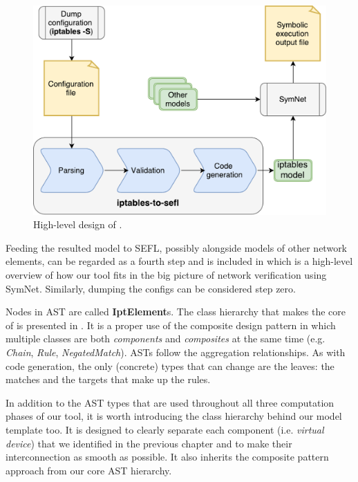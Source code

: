 \begin{figure}[h]
  \centering
  \captionsetup{justification=centering}
  \includegraphics[scale=0.5]{src/img/high-level-design}
  \caption{High-level design of \TOOL.}
  \label{fig:high-level-design}
\end{figure}

Feeding the resulted model to SEFL, possibly alongside models of other network
elements, can be regarded as a fourth step and is included in
 which is a high-level overview of
how our tool fits in the big picture of network verification using SymNet.
Similarly, dumping the configs can be considered step zero.

Nodes in AST are called \textbf{IptElement}s.  The class hierarchy that makes
the core of \TOOL is presented in .
It is a proper use of the composite design pattern in which multiple classes
are both \emph{components} and \emph{composites} at the same time (e.g.
\emph{Chain}, \emph{Rule}, \emph{NegatedMatch}).  ASTs follow the aggregation
relationships.  As with code generation, the only (concrete) types that can
change are the leaves: the matches and the targets that make up the rules.

In addition to the AST types that are used throughout all three computation
phases of our tool, it is worth introducing the class hierarchy behind our
model template too.  It is designed to clearly separate each component (i.e.
\emph{virtual device}) that we identified in the previous chapter and to make
their interconnection as smooth as possible. It also inherits the composite
pattern approach from our core AST hierarchy.

